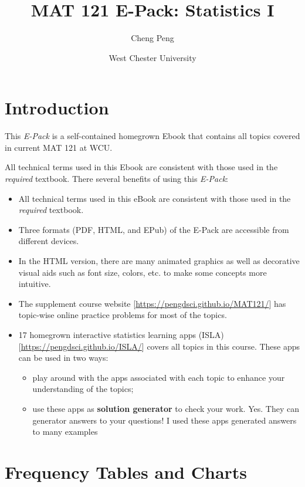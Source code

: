 \documentclass[
]{book}
\title{MAT 121 E-Pack: Statistics I}
\author{Cheng Peng}
\date{West Chester University}
\providecommand{\tightlist}{%
  \setlength{\itemsep}{0pt}\setlength{\parskip}{0pt}}
\begin{document}
\maketitle

{
\setcounter{tocdepth}{1}
\tableofcontents
}
\hypertarget{introduction}{%
\chapter{Introduction}\label{introduction}}

This \emph{E-Pack} is a self-contained homegrown Ebook that contains all topics covered in current MAT 121 at WCU.

All technical terms used in this Ebook are consistent with those used in the \emph{required} textbook. There several benefits of using this \emph{E-Pack}:

\begin{itemize}
\item
  All technical terms used in this eBook are consistent with those used in the \emph{required} textbook.
\item
  Three formats (PDF, HTML, and EPub) of the E-Pack are accessible from different devices.
\item
  In the HTML version, there are many animated graphics as well as decorative visual aids such as font size, colors, etc. to make some concepts more intuitive.
\item
  The supplement course website {[}\url{https://pengdsci.github.io/MAT121/}{]} has topic-wise online practice problems for most of the topics.
\item
  17 homegrown interactive statistics learning apps (ISLA) {[}\url{https://pengdsci.github.io/ISLA/}{]} covers all topics in this course. These apps can be used in two ways:

  \begin{itemize}
  \tightlist
  \item
    play around with the apps associated with each topic to enhance your understanding of the topics;
  \item
    use these apps as \textbf{solution generator} to check your work. Yes. They can generator answers to your questions! I used these apps generated answers to many examples
  \end{itemize}
\end{itemize}

\hypertarget{frequency-tables-and-charts}{%
\chapter{Frequency Tables and Charts}\label{frequency-tables-and-charts}}
\end{document}
